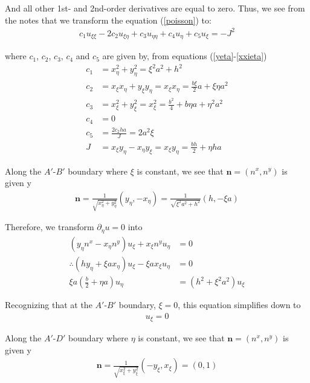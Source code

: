 \begin{enumerate}[label=(\roman*),leftmargin=*,itemsep=0mm]
    And all other 1st- and 2nd-order derivatives are equal to zero.  Thus, we see from the notes that we transform the equation (\ref{poisson}) to:
    \begin{align}
        c_1u_{\xi\xi} -2c_2u_{\xi\eta} + c_3u_{\eta\eta} + c_4u_\eta + c_5u_\xi = -J^2
    \end{align}
    
    where $c_1$, $c_2$, $c_3$, $c_4$ and $c_5$ are given by, from equations (\ref{yeta}-\ref{xxieta})
    \begin{align}
        c_1 &= x_\eta^2 + y_\eta^2 = \xi^2 a^2 + h^2 \\
        c_2 &= x_\xi x_\eta + y_\xi y_\eta = x_\xi x_\eta
        = \frac{b\xi}{2} a + \xi\eta a^2 \\
        c_3 &= x_\xi^2 + y_\xi^2 = x_\xi^2 = \frac{b^2}{4} + b\eta a + \eta^2a^2 \\
        c_4 &= 0 \\
        c_5 &= \frac{2c_2ha}{J} = 2a^2\xi \\
        J &= x_\xi y_\eta - x_\eta y_\xi = x_\xi y_\eta = \frac{bh}{2} + \eta ha
    \end{align}
    
    Along the $A'$-$B'$ boundary where $\xi$ is constant, we see that $\mathbf{n} = (n^x,n^y)$ is given y
    \begin{align*}
        \mathbf{n} = \frac{1}{\sqrt{x_\eta^2 + y_\eta^2}}(y_\eta,-x_\eta) = \frac{1}{\sqrt{\xi^2a^2 + h^2}} (h,-\xi a)
    \end{align*}
    
    Therefore, we transform $\partial_\eta u = 0$ into
    \begin{align*}
        (y_\eta n^x - x_\eta n^y)u_\xi + x_\xi n^y u_\eta &= 0 \nonumber \\
        \therefore (hy_\eta + \xi a x_\eta)u_\xi - \xi a x_\xi u_\eta &= 0 \\
        \xi a \left(\frac{b}{2} + \eta a\right) u_\eta
        &= (h^2 + \xi^2 a^2) u_\xi
    \end{align*}
    
    Recognizing that at the $A'$-$B'$ boundary, $\xi=0$, this equation simplifies down to
    \begin{align}
        u_\xi = 0
    \end{align}
    
    Along the $A'$-$D'$ boundary where $\eta$ is constant, we see that $\mathbf{n} = (n^x,n^y)$ is given y
    \begin{align*}
        \mathbf{n} = \frac{1}{\sqrt{x_\xi^2 + y_\xi^2}}(-y_\xi,x_\xi) = (0,1)
    \end{align*}
    

\end{enumerate}
